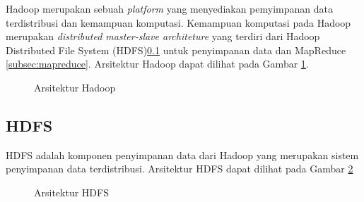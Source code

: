 Hadoop merupakan sebuah \textit{platform} yang menyediakan pemyimpanan data terdistribusi dan kemampuan komputasi. Kemampuan komputasi pada Hadoop merupakan \textit{distributed master-slave architeture} yang terdiri dari Hadoop Distributed File System (HDFS)\ref{subsec:hdfs} untuk penyimpanan data dan MapReduce \ref{subsec:mapreduce}. Arsitektur Hadoop dapat dilihat pada Gambar \ref{fig:arsitektur_hadoop}\cite{holmes2012hadoop}.

\begin{figure}
\centering
{}
\caption[Arsitektur Hadoop]{Arsitektur Hadoop} 
\label{fig:arsitektur_hadoop}
\end{figure}

\subsection{HDFS}
\label{subsec:hdfs}

HDFS adalah komponen penyimpanan data dari Hadoop yang merupakan sistem penyimpanan data terdistribusi. Arsitektur HDFS dapat dilihat pada Gambar \ref{fig:arsitektur_hdfs}

\begin{figure}
\centering
{}
\caption[Arsitektur HDFS]{Arsitektur HDFS} 
\label{fig:arsitektur_hdfs}
\end{figure}

